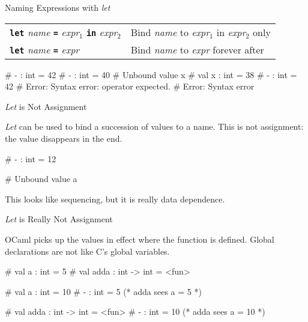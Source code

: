 \documentclass{plt}
\begin{document}
\begin{frame}[fragile]{Naming Expressions with \emph{let}}

  \begin{tabular}{ll}
    \textbf{\texttt{let}} \emph{name} \textbf{\texttt{=}}
    \emph{expr}$_1$ \texttt{\textbf{in}} \emph{expr}$_2$ &
  Bind \emph{name} to \emph{expr}$_1$ in \emph{expr}$_2$ only
  \\
  \textbf{\texttt{let}} \emph{name} \textbf{\texttt{=}} \emph{expr} &
  Bind \emph{name} to \emph{expr} forever after  

  \end{tabular}
  
\begin{interactive}
# 
  - : int = 42
\li
# 
- : int = 40
\li
# 
Unbound value x
\li
# 
val x : int = 38
\li
# 
- : int = 42
\li
# 
Error: Syntax error: operator expected.
\li
# 
Error: Syntax error
\end{interactive}

\end{frame}

\begin{frame}[fragile]{\emph{Let} is Not Assignment}

\emph{Let} can be used to bind a succession of values to a name.
This is not assignment: the value disappears in the end.

\begin{interactive}
# 
- : int = 12

# 
Unbound value a
\end{interactive}

This looks like sequencing, but it is really data dependence.

\end{frame}

\begin{frame}[fragile]{\emph{Let} is Really Not Assignment}

OCaml picks up the values in effect where the function
is defined.
\alert{Global declarations are not like C's global variables.}

\begin{interactive}
# 
val a : int = 5
# 
val adda : int -> int = <fun>

# 
val a : int = 10
# 
- : int = 5        \alert{(* adda sees a = 5 *)}

# 
val adda : int -> int = <fun>
# 
- : int = 10       \alert{(* adda sees a = 10 *)}
\end{interactive}

\end{frame}
\end{document}
